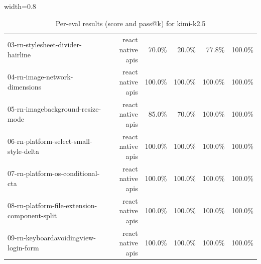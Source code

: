 \begin{table}[htbp]
\begin{adjustbox}{width=0.8\textwidth}
\begin{tabular}{lrrrrr}
03-rn-stylesheet-divider-hairline & react native apis & 70.0\% & 20.0\% & 77.8\% & 100.0\% \\
04-rn-image-network-dimensions & react native apis & 100.0\% & 100.0\% & 100.0\% & 100.0\% \\
05-rn-imagebackground-resize-mode & react native apis & 85.0\% & 70.0\% & 100.0\% & 100.0\% \\
06-rn-platform-select-small-style-delta & react native apis & 100.0\% & 100.0\% & 100.0\% & 100.0\% \\
07-rn-platform-os-conditional-cta & react native apis & 100.0\% & 100.0\% & 100.0\% & 100.0\% \\
08-rn-platform-file-extension-component-split & react native apis & 100.0\% & 100.0\% & 100.0\% & 100.0\% \\
09-rn-keyboardavoidingview-login-form & react native apis & 100.0\% & 100.0\% & 100.0\% & 100.0\% \\
\bottomrule
\end{tabular}
\end{adjustbox}
\caption{Per-eval results (score and pass@k) for kimi-k2.5}
\end{table}
